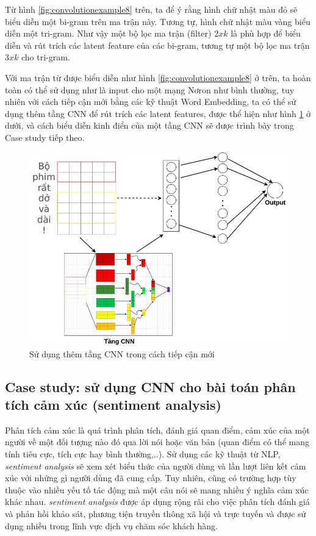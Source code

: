 Từ hình \ref{fig:convolutionexample8} trên, ta để ý rằng hình chữ nhật màu đỏ sẽ biểu diễn một bi-gram trên ma trận này. Tương tự, hình chữ nhật màu vàng biểu diễn một tri-gram. Như vậy một bộ lọc ma trận (filter) $2xk$ là phù hợp để biểu diễn và rút trích các latent feature của các bi-gram, tương tự một bộ lọc ma trận $3xk$ cho tri-gram.

Với ma trận từ được biểu diễn như hình \ref{fig:convolutionexample8} ở trên, ta hoàn toàn có thể sử dụng như là input cho một mạng Nơron như bình thường, tuy nhiên với cách tiếp cận mới bằng các kỹ thuật Word Embedding, ta có thể sử dụng thêm tầng CNN để rút trích các latent features, được thể hiện như hình \ref{fig:convolutionexample9} ở dưới, và cách biểu diễn kinh điển của một tầng CNN sẽ được trình bày trong Case study tiếp theo.
\clearpage
\begin{figure}[!h]
	\centering
		\includegraphics[width=1\columnwidth]{books/artificial-neural-network/chapter05/figure/convolution-example-9.jpg}
        \caption{Sử dụng thêm tầng CNN trong cách tiếp cận mới}
        \label{fig:convolutionexample9}
\end{figure}

\subsection{Case study: sử dụng CNN cho bài toán phân tích cảm xúc (sentiment analysis)}
Phân tích cảm xúc là quá trình phân tích, đánh giá quan điểm, cảm xúc của một người về một đối tượng nào đó qua lời nói hoặc văn bản (quan điểm có thể mang tính tiêu cực, tích cực hay bình thường,..). Sử dụng các kỹ thuật từ NLP, \textit{sentiment analysis} sẽ xem xét biểu thức của người dùng và lần lượt liên kết cảm xúc với những gì người dùng đã cung cấp. Tuy nhiên, cũng có trường hợp tùy thuộc vào nhiều yếu tố tác động mà một câu nói sẽ mang nhiều ý nghĩa cảm xúc khác nhau. \textit{sentiment analysis} được áp dụng rộng rãi cho việc phân tích đánh giá và phản hồi khảo sát, phương tiện truyền thông xã hội và trực tuyến và được sử dụng nhiều trong lĩnh vực dịch vụ chăm sóc khách hàng.

